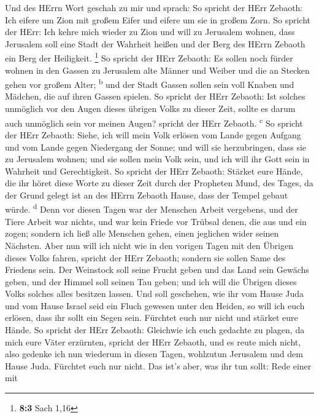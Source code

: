  Und des HErrn Wort geschah zu mir und sprach:
 So spricht der HErr Zebaoth: Ich eifere um Zion mit
großem Eifer und eifere um sie in großem Zorn.  So spricht
der HErr: Ich kehre mich wieder zu Zion und will zu Jerusalem wohnen,
dass Jerusalem soll eine Stadt der Wahrheit heißen und der Berg des
HErrn Zebaoth ein Berg der Heiligkeit. \footnote{\textbf{8:3} Sach 1,16}
 So spricht der HErr Zebaoth: Es sollen noch fürder wohnen
in den Gassen zu Jerusalem alte Männer und Weiber und die an Stecken
gehen vor großem Alter; \textsuperscript{b}  und der Stadt
Gassen sollen sein voll Knaben und Mädchen, die auf ihren Gassen
spielen.  So spricht der HErr Zebaoth: Ist solches
unmöglich vor den Augen dieses übrigen Volks zu dieser Zeit, sollte es
darum auch unmöglich sein vor meinen Augen? spricht der HErr Zebaoth.
\textsuperscript{c}  So spricht der HErr Zebaoth: Siehe,
ich will mein Volk erlösen vom Lande gegen Aufgang und vom Lande gegen
Niedergang der Sonne;  und will sie herzubringen, dass sie
zu Jerusalem wohnen; und sie sollen mein Volk sein, und ich will ihr
Gott sein in Wahrheit und Gerechtigkeit.  So spricht der
HErr Zebaoth: Stärket eure Hände, die ihr höret diese Worte zu dieser
Zeit durch der Propheten Mund, des Tages, da der Grund gelegt ist an des
HErrn Zebaoth Hause, dass der Tempel gebaut würde. \textsuperscript{d}
 Denn vor diesen Tagen war der Menschen Arbeit vergebens,
und der Tiere Arbeit war nichts, und war kein Friede vor Trübsal denen,
die aus und ein zogen; sondern ich ließ alle Menschen gehen, einen
jeglichen wider seinen Nächsten.  Aber nun will ich nicht
wie in den vorigen Tagen mit den Übrigen dieses Volks fahren, spricht
der HErr Zebaoth;  sondern sie sollen Same des Friedens
sein. Der Weinstock soll seine Frucht geben und das Land sein Gewächs
geben, und der Himmel soll seinen Tau geben; und ich will die Übrigen
dieses Volks solches alles besitzen lassen.  Und soll
geschehen, wie ihr vom Hause Juda und vom Hause Israel seid ein Fluch
gewesen unter den Heiden, so will ich euch erlösen, dass ihr sollt ein
Segen sein. Fürchtet euch nur nicht und stärket eure Hände.
 So spricht der HErr Zebaoth: Gleichwie ich euch gedachte
zu plagen, da mich eure Väter erzürnten, spricht der HErr Zebaoth, und
es reute mich nicht,  also gedenke ich nun wiederum in
diesen Tagen, wohlzutun Jerusalem und dem Hause Juda. Fürchtet euch nur
nicht.  Das ist's aber, was ihr tun sollt: Rede einer mit
